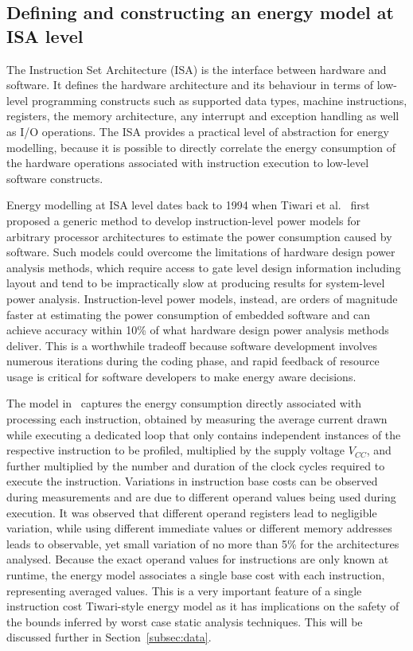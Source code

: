 \subsection{Defining and constructing an energy model at ISA level}

The Instruction Set Architecture (ISA) is the interface between hardware and
software. 
%
It defines the hardware architecture and its behaviour in terms of low-level
programming constructs such as supported data types, machine instructions,
registers, the memory architecture, any interrupt and exception handling as
well as I/O operations.
%
The ISA provides a practical level of abstraction for energy modelling, because
it is possible to directly correlate the energy consumption of the hardware
operations associated with instruction execution to low-level software
constructs.

Energy modelling at ISA level dates back to 1994 when Tiwari et
al.~\cite{Tiwari-embedded-1994} first proposed a
generic method to develop instruction-level power models for arbitrary
processor architectures to estimate the power consumption caused by software.
%
Such models could overcome the limitations of hardware design power analysis
methods, which require access to gate level design information including layout
and tend to be impractically slow at producing results for system-level power
analysis. Instruction-level power models, instead, are orders of magnitude
faster at estimating the power consumption of embedded software and can achieve
accuracy within 10\% of what hardware design power analysis methods deliver.
This is a worthwhile tradeoff because software development involves numerous
iterations during the coding phase, and rapid feedback of resource usage is
critical for software developers to make energy aware decisions.

The model in~\cite{Tiwari-embedded-1994} captures the energy consumption
directly associated with processing each instruction, obtained by measuring the
average current drawn while executing a dedicated loop that only contains
independent instances of the respective instruction to be profiled, multiplied
by the supply voltage $V_{CC}$, and further multiplied by the number and
duration of the clock cycles required to execute the instruction.
%
Variations in instruction base costs can be observed during measurements and
are due to different operand values being used during execution. It was observed that
different operand registers lead to negligible variation, while using different
immediate values or different memory addresses leads to observable, yet small
variation of no more than 5\% for the architectures analysed.
%
Because the exact operand values for instructions are only known at runtime,
the energy model associates a single base cost with each instruction,
representing averaged values. This is a very important feature of a single
instruction cost Tiwari-style energy model as it has implications on the safety
of the bounds inferred by worst case static analysis techniques. This will be
discussed further in Section~\ref{subsec:data}.

